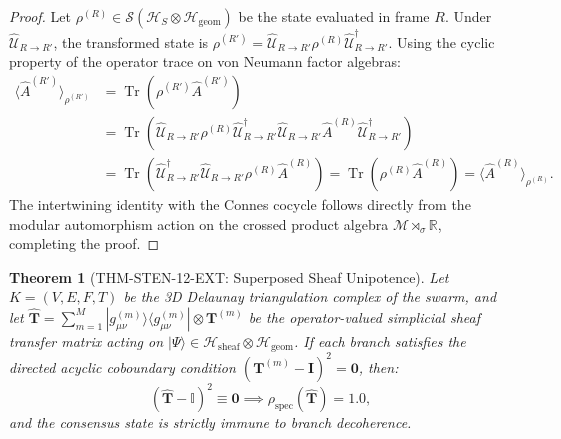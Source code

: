 \documentclass[11pt,onecolumn]{article}
\newtheorem{theorem}{Theorem}
\begin{document}
\begin{proof}
Let $\rho^{(R)} \in \mathcal{S}(\mathcal{H}_S \otimes \mathcal{H}_{\mathrm{geom}})$ be the state evaluated in frame $R$. Under $\hat{\mathcal{U}}_{R \to R'}$, the transformed state is $\rho^{(R')} = \hat{\mathcal{U}}_{R \to R'} \rho^{(R)} \hat{\mathcal{U}}_{R \to R'}^\dagger$. Using the cyclic property of the operator trace on von Neumann factor algebras:
\begin{align*}
    \langle \hat{A}^{(R')} \rangle_{\rho^{(R')}}
    &= \operatorname{Tr}\left( \rho^{(R')} \hat{A}^{(R')} \right) \\
    &= \operatorname{Tr}\left( \hat{\mathcal{U}}_{R \to R'} \rho^{(R)} \hat{\mathcal{U}}_{R \to R'}^\dagger \hat{\mathcal{U}}_{R \to R'} \hat{A}^{(R)} \hat{\mathcal{U}}_{R \to R'}^\dagger \right) \\
    &= \operatorname{Tr}\left( \hat{\mathcal{U}}_{R \to R'}^\dagger \hat{\mathcal{U}}_{R \to R'} \rho^{(R)} \hat{A}^{(R)} \right)
    = \operatorname{Tr}\left( \rho^{(R)} \hat{A}^{(R)} \right) = \langle \hat{A}^{(R)} \rangle_{\rho^{(R)}}.
\end{align*}
The intertwining identity with the Connes cocycle follows directly from the modular automorphism action on the crossed product algebra $\mathcal{M} \rtimes_\sigma \mathbb{R}$, completing the proof.
\end{proof}

\begin{theorem}[THM-STEN-12-EXT: Superposed Sheaf Unipotence]
\label{thm:sten_12_ext}
Let $K = (V, E, F, T)$ be the 3D Delaunay triangulation complex of the swarm, and let $\hat{\mathbf{T}} = \sum_{m=1}^M |g_{\mu\nu}^{(m)}\rangle \langle g_{\mu\nu}^{(m)}| \otimes \mathbf{T}^{(m)}$ be the operator-valued simplicial sheaf transfer matrix acting on $|\Psi\rangle \in \mathcal{H}_{\mathrm{sheaf}} \otimes \mathcal{H}_{\mathrm{geom}}$. If each branch satisfies the directed acyclic coboundary condition $(\mathbf{T}^{(m)} - \mathbf{I})^2 = \mathbf{0}$, then:
\begin{equation}
    (\hat{\mathbf{T}} - \mathbb{I})^2 \equiv \mathbf{0} \implies \rho_{\mathrm{spec}}(\hat{\mathbf{T}}) = 1.0,
\end{equation}
and the consensus state is strictly immune to branch decoherence.
\end{theorem}
\end{document}
